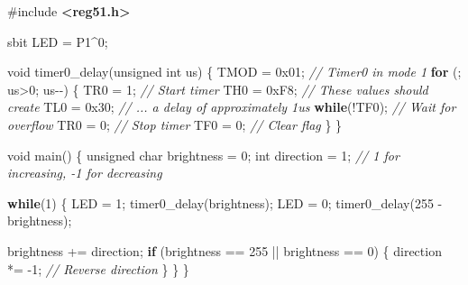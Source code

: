 \documentclass[
]{article}
\newenvironment{Shaded}{}{}
\newcommand{\BaseNTok}[1]{\textcolor[rgb]{0.25,0.63,0.44}{#1}}
\newcommand{\CommentTok}[1]{\textcolor[rgb]{0.38,0.63,0.69}{\textit{#1}}}
\newcommand{\ControlFlowTok}[1]{\textcolor[rgb]{0.00,0.44,0.13}{\textbf{#1}}}
\newcommand{\DataTypeTok}[1]{\textcolor[rgb]{0.56,0.13,0.00}{#1}}
\newcommand{\DecValTok}[1]{\textcolor[rgb]{0.25,0.63,0.44}{#1}}
\newcommand{\ImportTok}[1]{\textcolor[rgb]{0.00,0.50,0.00}{\textbf{#1}}}
\newcommand{\NormalTok}[1]{#1}
\newcommand{\OperatorTok}[1]{\textcolor[rgb]{0.40,0.40,0.40}{#1}}
\newcommand{\PreprocessorTok}[1]{\textcolor[rgb]{0.74,0.48,0.00}{#1}}
\begin{document}
\begin{Shaded}
\begin{Highlighting}[]
\PreprocessorTok{\#include }\ImportTok{\textless{}reg51.h\textgreater{}}

\NormalTok{sbit LED }\OperatorTok{=}\NormalTok{ P1}\OperatorTok{\^{}}\DecValTok{0}\OperatorTok{;}

\DataTypeTok{void}\NormalTok{ timer0\_delay}\OperatorTok{(}\DataTypeTok{unsigned} \DataTypeTok{int}\NormalTok{ us}\OperatorTok{)} \OperatorTok{\{}
\NormalTok{    TMOD }\OperatorTok{=} \BaseNTok{0x01}\OperatorTok{;}  \CommentTok{// Timer0 in mode 1}
    \ControlFlowTok{for} \OperatorTok{(;}\NormalTok{ us}\OperatorTok{\textgreater{}}\DecValTok{0}\OperatorTok{;}\NormalTok{ us}\OperatorTok{{-}{-})} \OperatorTok{\{}
\NormalTok{        TR0 }\OperatorTok{=} \DecValTok{1}\OperatorTok{;}      \CommentTok{// Start timer}
\NormalTok{        TH0 }\OperatorTok{=} \BaseNTok{0xF8}\OperatorTok{;}   \CommentTok{// These values should create}
\NormalTok{        TL0 }\OperatorTok{=} \BaseNTok{0x30}\OperatorTok{;}   \CommentTok{// ... a delay of approximately 1us}
        \ControlFlowTok{while}\OperatorTok{(!}\NormalTok{TF0}\OperatorTok{);}  \CommentTok{// Wait for overflow}
\NormalTok{        TR0 }\OperatorTok{=} \DecValTok{0}\OperatorTok{;}      \CommentTok{// Stop timer}
\NormalTok{        TF0 }\OperatorTok{=} \DecValTok{0}\OperatorTok{;}      \CommentTok{// Clear flag}
    \OperatorTok{\}}
\OperatorTok{\}}

\DataTypeTok{void}\NormalTok{ main}\OperatorTok{()} \OperatorTok{\{}
    \DataTypeTok{unsigned} \DataTypeTok{char}\NormalTok{ brightness }\OperatorTok{=} \DecValTok{0}\OperatorTok{;}
    \DataTypeTok{int}\NormalTok{ direction }\OperatorTok{=} \DecValTok{1}\OperatorTok{;} \CommentTok{// 1 for increasing, {-}1 for decreasing}

    \ControlFlowTok{while}\OperatorTok{(}\DecValTok{1}\OperatorTok{)} \OperatorTok{\{}
\NormalTok{        LED }\OperatorTok{=} \DecValTok{1}\OperatorTok{;}
\NormalTok{        timer0\_delay}\OperatorTok{(}\NormalTok{brightness}\OperatorTok{);}
\NormalTok{        LED }\OperatorTok{=} \DecValTok{0}\OperatorTok{;}
\NormalTok{        timer0\_delay}\OperatorTok{(}\DecValTok{255} \OperatorTok{{-}}\NormalTok{ brightness}\OperatorTok{);}

\NormalTok{        brightness }\OperatorTok{+=}\NormalTok{ direction}\OperatorTok{;}
        \ControlFlowTok{if} \OperatorTok{(}\NormalTok{brightness }\OperatorTok{==} \DecValTok{255} \OperatorTok{||}\NormalTok{ brightness }\OperatorTok{==} \DecValTok{0}\OperatorTok{)} \OperatorTok{\{}
\NormalTok{            direction }\OperatorTok{*=} \OperatorTok{{-}}\DecValTok{1}\OperatorTok{;}  \CommentTok{// Reverse direction}
        \OperatorTok{\}}
    \OperatorTok{\}}
\OperatorTok{\}}
\end{Highlighting}
\end{Shaded}
\end{document}
